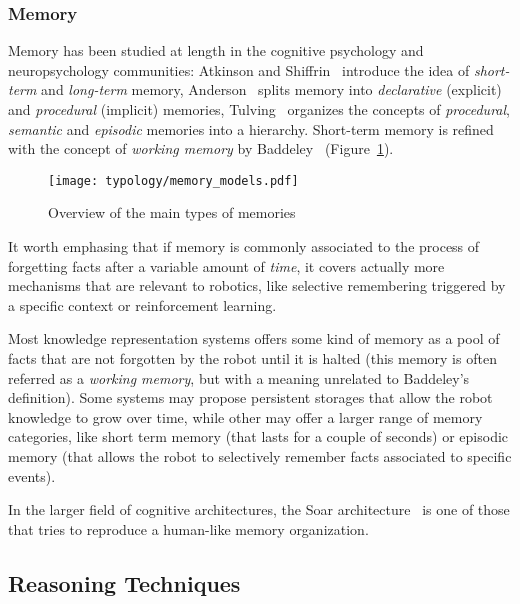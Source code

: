 \subsubsection{Memory}
\label{sect|memory}

Memory has been studied at length in the cognitive psychology and
neuropsychology communities: Atkinson and Shiffrin~\cite{Atkinson1968}
introduce the idea of \emph{short-term} and \emph{long-term} memory,
Anderson~\cite{Anderson1976} splits memory into \emph{declarative} (explicit)
and \emph{procedural} (implicit) memories, Tulving~\cite{Tulving1985} organizes
the concepts of \emph{procedural}, \emph{semantic} and \emph{episodic} memories
into a hierarchy. Short-term memory is refined with the concept of
\emph{working memory} by Baddeley~\cite{Baddeley2010}
(Figure~\ref{fig|memory_models}).

\begin{figure}
    \centering
    \texttt{[image: typology/memory\_models.pdf]}
    \caption{Overview of the main types of memories}
    \label{fig|memory_models}
\end{figure}

It worth emphasing that if memory is commonly associated to the process of
forgetting facts after a variable amount of \emph{time}, it covers actually
more mechanisms that are relevant to robotics, like selective remembering
triggered by a specific context or reinforcement learning.

Most knowledge representation systems offers some kind of memory as a pool of
facts that are not forgotten by the robot until it is halted (this memory is
often referred as a \emph{working memory}, but with a meaning unrelated to
Baddeley's definition). Some systems may propose persistent storages that allow
the robot knowledge to grow over time, while other may offer a larger range of
memory categories, like short term memory (that lasts for a couple of seconds)
or episodic memory (that allows the robot to selectively remember facts
associated to specific events).

In the larger field of cognitive architectures, the {\sc Soar}
architecture~\cite{Lehman2006} is one of those that tries to reproduce a
human-like memory organization.

\subsection{Reasoning Techniques}
\label{sect|reasoning}

